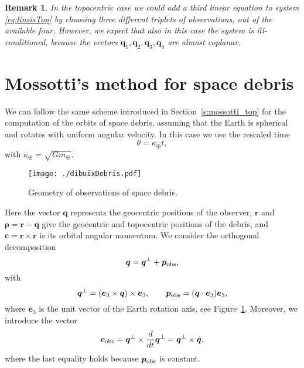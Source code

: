 \documentclass[11pt]{article}
\def\angmom{\bm{c}}
\def\bq{\bm{q}}
\def\br{\bm{r}}
\def\pobs{\bm{p}_{\rm obs}}
\def\rhovec{{\bm{\rho}}}
\def\erre{{\bm{r}}}
\def\erredot{\dot{\erre}}
\def\angmom{{\bm{c}}}
\def\etre{{\bm e}_3}
\def\obs{{\rm obs}}
\def\dbq{\dot{\bm{q}}}
\def\bqperp{\bm{q}^\perp}
\def\dbqperp{\frac{d}{dt}{\bm{q}}^\perp}
\def\obs{{\rm obs}}
\newtheorem{remark}{\bf Remark}
\begin{document}
\begin{remark}
    In the topocentric case we could add a third linear equation to system \eqref{eq:linsisTop} by choosing three different triplets of observations, out of the available four.  
    However, we expect that also in this case the system is ill-conditioned, because the vectors $\bq_1,\bq_2,\bq_3,\bq_4$ are almost coplanar.
\end{remark}



\section{Mossotti's method for space debris}
\label{s:mossotti_deb}

We can follow the same scheme introduced in Section~\ref{s:mossotti_top} for the computation of the orbits of space debris, assuming that the Earth is spherical and rotates with uniform angular velocity.  
In this case we use the rescaled time
\begin{equation*}
    \theta = \kappa_\oplus t,
\end{equation*}
with $\kappa_\oplus = \sqrt{Gm_\oplus}$.
%
\begin{figure}
    \begin{center}
    \texttt{[image: ./dibuixDebris.pdf]}
    \end{center}
    \caption{Geometry of observations of space debris.}
    \label{fig:debris}
\end{figure}
Here the vector $\bq$ represents the geocentric positions of the observer, $\br$ and $\rhovec = \br - \bq$ give the geocentric and topocentric positions of the debris, and $\angmom=\erre\times\erredot$ is its orbital angular momentum.  
We consider the orthogonal decomposition
\begin{equation*}
    \bq = \bqperp + \pobs,
\end{equation*}
with
\begin{equation*}
    \bqperp = (\etre\times\bq)\times\etre, \qquad \pobs = (\bq\cdot\etre)\etre,
\end{equation*}
where $\etre$ is the unit vector of the Earth rotation axis, see Figure~\ref{fig:debris}.
Moreover, we introduce the vector
\begin{equation*}
    \angmom_\obs = \bqperp\times\dbqperp= \bqperp\times\dbq,
\end{equation*}
where the last equality holds because $\pobs$ is constant.
\end{document}
